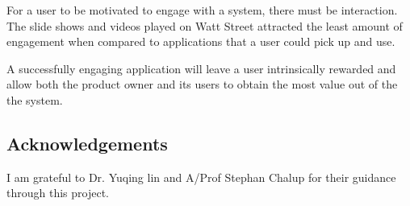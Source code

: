 \documentclass[a4paper,12pt]{article}
\begin{document}
For a user to be motivated to engage with a system, there must be interaction. The slide shows and videos played on Watt Street attracted the least amount of engagement when compared to applications that a user could pick up and use.

A successfully engaging application will leave a user intrinsically rewarded and allow both the product owner and its users to obtain the most value out of the the system.

\subsection*{Acknowledgements}
I am grateful to Dr. Yuqing lin and A/Prof Stephan Chalup for their guidance through this project.
%
\vskip 0.2in
\newpage


\end{document}
